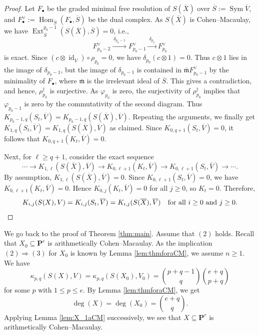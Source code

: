 \documentclass[12pt]{amsart}
\theoremstyle{definition}
\theoremstyle{remark}
\theoremstyle{corollary}
\theoremstyle{theorem}
\theoremstyle{corollary}
\theoremstyle{corollary}
\theoremstyle{definition}
\theoremstyle{remark}
\numberwithin{equation}{section}
\def\nP{\mathbf{P}}
\def\Sym{\operatorname{Sym}}
\begin{document}
\begin{proof}
Let $F_{\bullet}$ be the graded minimal free resolution of $S(\overline{X})$ over $\overline{S}:=\Sym \overline{V}$, and $F_{\bullet}^{\vee}:=\operatorname{Hom}_{\overline{S}}(F_{\bullet}, \overline{S})$ be the dual complex. 
As $S(\overline{X})$ is Cohen--Macaulay, we have $\operatorname{Ext}_{\overline{S}}^{p_0-1}(S(\overline{X}), \overline{S})=0$, i.e.,
$$
F_{p_0-2}^{\vee} \xrightarrow{~\delta_{p_0-1}~} F_{p_0-1}^{\vee} \xrightarrow{~\delta_{p_0}~} F_{p_0}^{\vee}
$$
is exact. Since $(c \otimes \operatorname{id}_{\overline{V}}) \circ \rho_{p_0} = 0$, we have $\delta_{p_0}(c \otimes 1) = 0$. Thus $c \otimes 1$ lies in the image of $\delta_{p_0-1}$, but the image of $\delta_{p_0-1}$ is contained in  $\overline{\mathfrak{m}} F_{p_0-1}^{\vee}$ by the minimality of $F_{\bullet}$, where $\overline{\mathfrak{m}}$ is the irrelevant ideal of $\overline{S}$. This gives a contradiction, and hence, $\rho_{p_0}^{\dagger}$ is surjective. As $\varphi_{p_0}$ is zero, the surjectivity of $\rho_{p_0}^{\dagger}$ implies that $\varphi_{p_0-1}$ is zero by the commutativity of the second diagram. 
Thus $K_{p_0-1,q}(S_t, \overline{V}) = K_{p_0-1,q}(S(\overline{X}), \overline{V})$. Repeating the arguments, we finally get $K_{1,q}(S_t, \overline{V}) = K_{1,q}(S(\overline{X}), \overline{V})$ as claimed. Since $K_{0,q+1}(S_t, \overline{V})=0$, it follows that $K_{0,q+1}(K_t, \overline{V})=0$. 

\medskip

Next, for $\ell \geq q+1$, consider the exact sequence
$$
\cdots \longrightarrow K_{1,\ell}(S(\overline{X}), \overline{V}) \longrightarrow K_{0, \ell+1}(K_t, \overline{V}) \longrightarrow K_{0,\ell+1}(S_t, \overline{V}) \longrightarrow \cdots. 
$$
By assumption, $K_{1,\ell}(S(\overline{X}), \overline{V})=0$. Since $K_{0,\ell+1}(S_t, \overline{V})=0$, we have $K_{0,\ell+1}(K_t, \overline{V})=0$. Hence $K_{0,j}(K_t, \overline{V})=0$ for all $j \geq 0$, so $K_t=0$. Therefore,
\[
K_{i,j}(S(X), V) = K_{i,j}(S_t, \overline{V}) = K_{i,j}(S(\overline{X}), \overline{V})~~\text{ for all $i \geq 0$ and $j \geq 0$}. \qedhere
\]
\end{proof}

We go back to the proof of Theorem \ref{thm:main}.
Assume that $(2)$ holds. Recall that $X_0 \subseteq \nP^e$ is arithmetically Cohen--Macaulay. As the implication $(2) \Longrightarrow (3)$ for $X_0$ is known by Lemma \ref{lem:thmforaCM}, we assume $n \geq 1$. We have
$$
\kappa_{p,q}(S(X), V) =\kappa_{p,q}(S(X_0), V_0) = {p+q-1 \choose q} {e+q \choose p+q}
$$
for some $p$ with $1 \leq p \leq e$.
By Lemma \ref{lem:thmforaCM}, we get
$$
\deg(X)=\deg(X_0) =  {e+q \choose q}.
$$
Applying Lemma \ref{lem:X_1aCM} successively, we see that $X \subseteq \nP^r$ is arithmetically Cohen--Macaulay.
\end{document}
